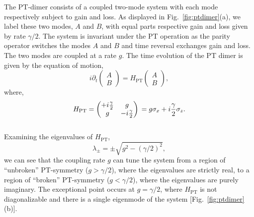 \documentclass[prl,twocolumn,english,superscriptaddress,floatfix,longbibliography]{revtex4-2}
\begin{document}
The PT-dimer consists of a coupled two-mode system with each mode respectively subject to gain and loss. As displayed in Fig.~\ref{fig:ptdimer}(a), we label these two modes, $A$ and $B$, with equal parts respective gain and loss given by rate $\gamma/2$. The system is invariant under the PT operation as the parity operator switches the modes $A$ and $B$ and time reversal exchanges gain and loss. The two modes are coupled at a rate $g$. The time evolution of the PT dimer is given by the equation of motion, 
\begin{equation}
    i\partial_{t} \begin{pmatrix} A\\B \end{pmatrix} = H_\mathrm{PT} \begin{pmatrix} A\\B \end{pmatrix} , 
\end{equation}
where,
\begin{equation}
    H_\mathrm{PT} = \begin{pmatrix} +i\frac{\gamma}{2}&g\\g& -i\frac{\gamma}{2}\end{pmatrix}
    \label{eq:ptdimer}\\ = g \sigma_{x}+i\frac{\gamma}{2}\sigma_{z}.
\end{equation}\\
Examining the eigenvalues of $H_\mathrm{PT}$, 
\begin{equation}
    \lambda_{\pm} = \pm \sqrt{g^{2}- (\gamma /2)^{2}},
\end{equation}
we can see that the coupling rate $g$ can tune the system from a region of ``unbroken'' PT-symmetry ($g>\gamma/2$), where the  eigenvalues are strictly real, to a region of ``broken'' PT-symmetry ($g<\gamma/2$), where the eigenvalues are purely imaginary. The exceptional point occurs at $g = \gamma/2$, where $H_\mathrm{PT}$ is not diagonalizable and there is a single eigenmode of the system [Fig.~\ref{fig:ptdimer}(b)].%
\end{document}
